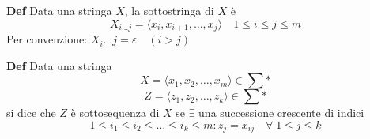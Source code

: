 \begin{mdframed}
    \textbf{Def} Data una stringa $X$, la sottostringa di $X$ è
    \begin{equation*}
        X_{i \ldots j} = \langle x_i, x_{i+1}, \ldots, x_j \rangle \quad 1 \leq i \leq j \leq m
    \end{equation*}
    Per convenzione: $X_i \ldots j = \varepsilon \quad (i > j)$
\end{mdframed}

\begin{mdframed}
    \textbf{Def} Data una stringa
    \begin{equation*}
        X = \langle x_1, x_2, \ldots, x_m \rangle \in \sum*
    \end{equation*}
    \begin{equation*}
        Z = \langle z_1, z_2, \ldots, z_k \rangle \in \sum*
    \end{equation*}
    si dice che $Z$ è sottosequenza di $X$ se $\exists$ una successione crescente di indici
    \begin{equation*}
        1 \leq i_1 \leq i_2 \leq \ldots \leq i_k \leq m: z_j = x_{ij} \quad \forall\; 1 \leq j \leq k
    \end{equation*}
\end{mdframed}

\newpage
